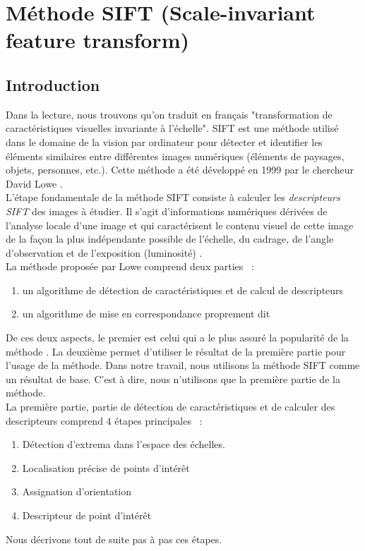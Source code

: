 \section{Méthode SIFT (Scale-invariant feature transform)}
\subsection{Introduction}
Dans la lecture, nous trouvons qu'on traduit en français "transformation de caractéristiques visuelles invariante à l'échelle". SIFT est une méthode utilisé dans le domaine de la vision par ordinateur pour détecter et identifier les éléments similaires entre différentes images numériques (éléments de paysages, objets, personnes, etc.). Cette méthode a été développé en 1999 par le chercheur David Lowe \cite{low99}.\\

L'étape fondamentale de la méthode SIFT consiste à calculer les \textit{descripteurs SIFT} des images à étudier. Il s'agit d'informations numériques dérivées de l'analyse locale d'une image et qui caractérisent le contenu visuel de cette image de la façon la plus indépendante possible de l'échelle, du cadrage, de l'angle d'observation et de l'exposition (luminosité) \cite{low99}.\\

La méthode proposée par Lowe comprend deux parties \cite{low04}~:
\begin{enumerate}
\item un algorithme de détection de caractéristiques et de calcul de descripteurs
\item un algorithme de mise en correspondance proprement dit
\end{enumerate}
De ces deux aspects, le premier est celui qui a le plus assuré la popularité de la méthode \cite{mt10}. La deuxième permet d'utiliser le résultat de la première partie pour l'usage de la méthode. Dans notre travail, nous utilisons la méthode SIFT comme un résultat de base. C'est à dire, nous n'utilisons que la première partie de la méthode.\\

La première partie, partie de détection de caractéristiques et de calculer des descripteurs comprend 4 étapes principales \cite{low99, low04}~:
\begin{enumerate}
\item Détection d'extrema dans l'espace des échelles.
\item Localisation précise de points d'intérêt
\item Assignation d'orientation
\item Descripteur de point d'intérêt
\end{enumerate}
Nous décrivons tout de suite pas à pas ces étapes.

